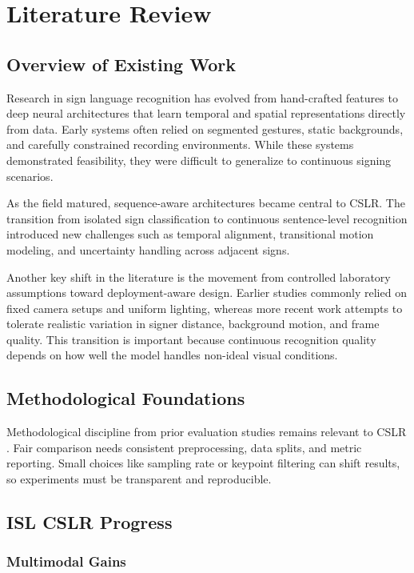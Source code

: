 \chapter{Literature Review}

\section{Overview of Existing Work}

Research in sign language recognition has evolved from hand-crafted features to deep neural architectures that learn temporal and spatial representations directly from data. Early systems often relied on segmented gestures, static backgrounds, and carefully constrained recording environments. While these systems demonstrated feasibility, they were difficult to generalize to continuous signing scenarios.

As the field matured, sequence-aware architectures became central to CSLR. The transition from isolated sign classification to continuous sentence-level recognition introduced new challenges such as temporal alignment, transitional motion modeling, and uncertainty handling across adjacent signs.

Another key shift in the literature is the movement from controlled laboratory assumptions toward deployment-aware design. Earlier studies commonly relied on fixed camera setups and uniform lighting, whereas more recent work attempts to tolerate realistic variation in signer distance, background motion, and frame quality. This transition is important because continuous recognition quality depends on how well the model handles non-ideal visual conditions.


\section{Methodological Foundations}

Methodological discipline from prior evaluation studies remains relevant to CSLR \citep{agarwal1988cache}. Fair comparison needs consistent preprocessing, data splits, and metric reporting. Small choices like sampling rate or keypoint filtering can shift results, so experiments must be transparent and reproducible.

\section{ISL CSLR Progress}

\subsection{Multimodal Gains}


